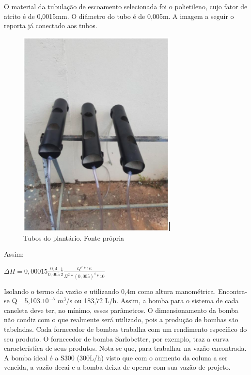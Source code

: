 O material da tubulação de escoamento selecionada foi o polietileno, cujo fator de atrito é de 0,0015mm. O diâmetro do tubo é de 0,005m. A imagem a seguir o reporta já conectado aos tubos. 

\begin{figure}[H]
	\centering
	\includegraphics[width=8cm]{figuras/tubos_plantario.png}
	\caption{Tubos do plantário. Fonte própria}
	\label{fatores_atrito}
\end{figure}

Assim:

\begin{center}
	\large
	${\displaystyle \Delta H = 0,00015 \frac{0,4}{0,005} \frac{1}{2} \frac{Q^2*16}{\Pi^2 * (0,005)^4*10}}$
\end{center}

Isolando o termo da vazão e utilizando 0,4m como altura manométrica. Encontra-se Q= 5,103.$10^{-5}$ $m^{3}$/s ou 183,72 L/h. Assim, a bomba para o sistema de cada caneleta deve ter, no mínimo, esses parâmetros.
O dimensionamento da bomba não condiz com o que realmente será utilizado, pois a produção de bombas são tabeladas. Cada fornecedor de bombas trabalha com um rendimento específico do seu produto. O fornecedor de bomba Sarlobetter, por exemplo, traz a curva característica de seus produtos. Nota-se que, para trabalhar na vazão encontrada. A bomba ideal é a S300 (300L/h) visto que com o aumento da coluna a ser vencida, a vazão decai e a bomba deixa de operar com sua vazão de projeto.  

